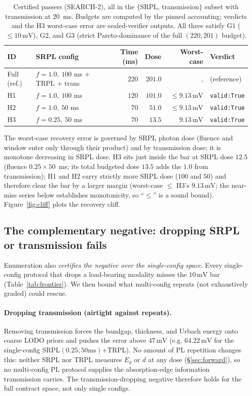 \documentclass[11pt]{article}
\newcommand{\mV}{\,\mathrm{mV}}
\begin{document}
\begin{table}[t]
\centering
\caption{Certified passers (SEARCH-2), all in the $\{$SRPL, transmission$\}$ subset with transmission at $20$~ms. Budgets are computed by the pinned accounting; verdicts and the H3 worst-case error are sealed-verifier outputs. All three satisfy G1 ($\le 10\mV$), G2, and G3 (strict Pareto-dominance of the full $(220,201)$ budget).}
\label{tab:hits}
\begin{tabular}{llrrrl}
\toprule
ID & SRPL config & Time (ms) & Dose & Worst-case & Verdict \\
\midrule
Full (ref.) & $f{=}1.0,\ 100$ ms $+$ TRPL $+$ trans & $220$ & $201.0$ &, & (reference) \\
H1 & $f{=}1.0,\ 100$ ms & $120$ & $101.0$ & $\le 9.13\mV$ & \texttt{valid:True} \\
H2 & $f{=}1.0,\ 50$ ms  & $70$  & $51.0$  & $\le 9.13\mV$ & \texttt{valid:True} \\
H3 & $f{=}0.25,\ 50$ ms & $70$  & $13.5$  & $9.13\mV$     & \texttt{valid:True} \\
\bottomrule
\end{tabular}
\end{table}

The worst-case recovery error is governed by SRPL photon dose (fluence and window enter only through their product) and by transmission dose; it is monotone decreasing in SRPL dose. H3 sits just inside the bar at SRPL dose $12.5$ (fluence $0.25\times50$~ms; its total budgeted dose $13.5$ adds the $1.0$ from transmission); H1 and H2 carry strictly more SRPL dose ($100$ and $50$) and therefore clear the bar by a larger margin (worst-case $\le$ H3's $9.13\mV$; the near-miss series below establishes monotonicity, so ``$\le$'' is a sound bound). Figure~\ref{fig:cliff} plots the recovery cliff.

\subsection{The complementary negative: dropping SRPL or transmission fails}
\label{sec:negative}

Enumeration also \emph{certifies the negative over the single-config space}. Every single-config protocol that drops a load-bearing modality misses the $10\mV$ bar (Table~\ref{tab:frontier}). We then bound what multi-config repeats (not exhaustively graded) could rescue.

\paragraph{Dropping transmission (airtight against repeats).} Removing transmission forces the bandgap, thickness, and Urbach energy onto coarse LODO priors and pushes the error above $47\mV$ (e.g. $64.22\mV$ for the single-config SRPL$(0.25,50\text{ms})$+TRPL). No amount of PL repetition changes this: neither SRPL nor TRPL measures $E_g$ or $d$ at any dose (\S\ref{sec:forward}), so no multi-config PL protocol supplies the absorption-edge information transmission carries. The transmission-dropping negative therefore holds for the full contract space, not only single configs.
\end{document}
